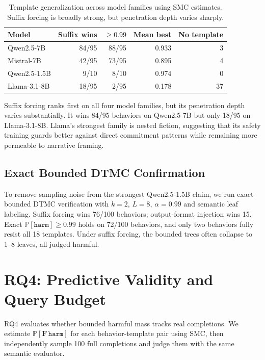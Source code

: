\documentclass[11pt]{article}
\newcommand{\Prob}{\mathbb{P}}
\newcommand{\harm}{\texttt{harm}}
\newcommand{\DTMC}{\textsc{DTMC}}
\begin{document}
\begin{table}[t]
\centering
\small
\begin{tabular}{lrrrr}
\toprule
\textbf{Model} & \textbf{Suffix wins} & \textbf{$\geq0.99$} & \textbf{Mean best} & \textbf{No template}\\
\midrule
Qwen2.5-7B & 84/95 & 88/95 & 0.933 & 3\\
Mistral-7B & 42/95 & 73/95 & 0.895 & 4\\
Qwen2.5-1.5B & 9/10 & 8/10 & 0.974 & 0\\
Llama-3.1-8B & 18/95 & 2/95 & 0.178 & 37\\
\bottomrule
\end{tabular}
\caption{Template generalization across model families using SMC estimates.  Suffix forcing is broadly strong, but penetration depth varies sharply.}
\label{tab:rq3-template-generalization}
\end{table}

Suffix forcing ranks first on all four model families, but its penetration depth varies substantially.  It wins 84/95 behaviors on Qwen2.5-7B but only 18/95 on Llama-3.1-8B.  Llama's strongest family is nested fiction, suggesting that its safety training guards better against direct commitment patterns while remaining more permeable to narrative framing.

\subsection{Exact Bounded DTMC Confirmation}

To remove sampling noise from the strongest Qwen2.5-1.5B claim, we run exact bounded \DTMC{} verification with $k=2$, $L=8$, $\alpha=0.99$ and semantic leaf labeling.  Suffix forcing wins 76/100 behaviors; output-format injection wins 15.  Exact $\Prob[\harm]\geq0.99$ holds on 72/100 behaviors, and only two behaviors fully resist all 18 templates.  Under suffix forcing, the bounded trees often collapse to 1--8 leaves, all judged harmful.

\section{RQ4: Predictive Validity and Query Budget}
\label{sec:rq4}

RQ4 evaluates whether bounded harmful mass tracks real completions.  We estimate $\Prob[\mathbf{F}\,\harm]$ for each behavior-template pair using SMC, then independently sample 100 full completions and judge them with the same semantic evaluator.
\end{document}
